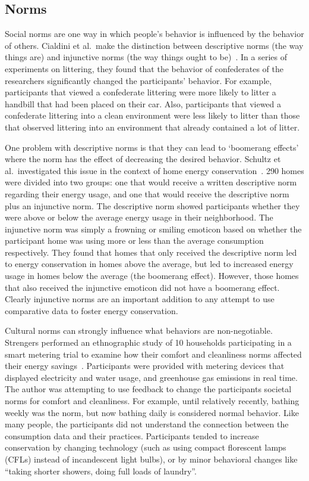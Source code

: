 \subsection{Norms}
\label{sec:norms}

Social norms are one way in which people's behavior is influenced by the behavior of others. Cialdini et al.\ make the distinction between descriptive norms (the way things are) and injunctive norms (the way things ought to be)~\cite{Cialdini90}. In a series of experiments on littering, they found that the behavior of confederates of the researchers significantly changed the participants' behavior. For example, participants that viewed a confederate littering were more likely to litter a handbill that had been placed on their car. Also, participants that viewed a confederate littering into a clean environment were less likely to litter than those that observed littering into an environment that already contained a lot of litter.

One problem with descriptive norms is that they can lead to `boomerang effects' where the norm has the effect of decreasing the desired behavior. Schultz et al.\ investigated this issue in the context of home energy conservation~\cite{Schultz2007SocialNorms}. 290 homes were divided into two groups: one that would receive a written descriptive norm regarding their energy usage, and one that would receive the descriptive norm plus an injunctive norm. The descriptive norm showed participants whether they were above or below the average energy usage in their neighborhood. The injunctive norm was simply a frowning or smiling emoticon based on whether the participant home was using more or less than the average consumption respectively. They found that homes that only received the descriptive norm led to energy conservation in homes above the average, but led to increased energy usage in homes below the average (the boomerang effect). However, those homes that also received the injunctive emoticon did not have a boomerang effect. Clearly injunctive norms are an important addition to any attempt to use comparative data to foster energy conservation.

Cultural norms can strongly influence what behaviors are non-negotiable. Strengers performed an ethnographic study of 10 households participating in a smart metering trial to examine how their comfort and cleanliness norms affected their energy savings~\cite{strengers-comfort-norms-2008}. Participants were provided with metering devices that displayed electricity and water usage, and greenhouse gas emissions in real time. The author was attempting to use feedback to change the participants societal norms for comfort and cleanliness. For example, until relatively recently, bathing weekly was the norm, but now bathing daily is considered normal behavior. Like many people, the participants did not understand the connection between the consumption data and their practices. Participants tended to increase conservation by changing technology (such as using compact florescent lamps (CFLs) instead of incandescent light bulbs), or by minor behavioral changes like ``taking shorter showers, doing full loads of laundry''.

